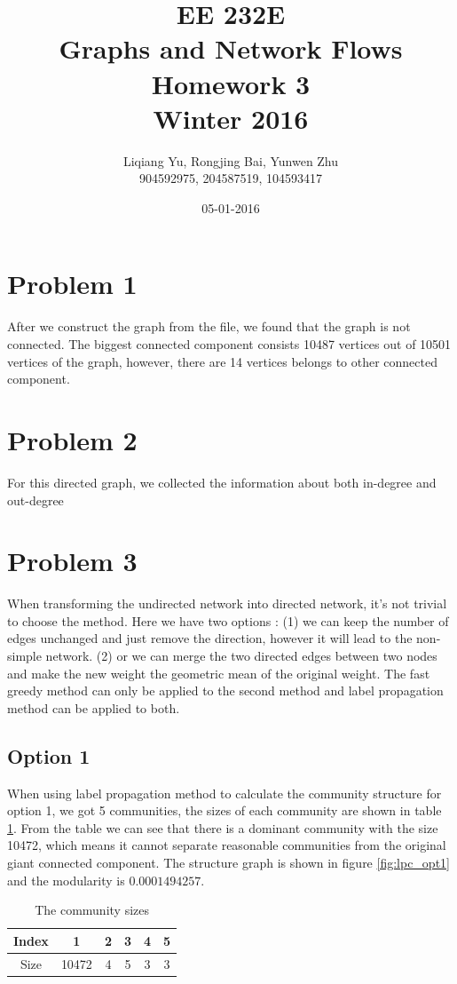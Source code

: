 \documentclass{article}
\begin{document}
\begin{titlepage}
\title{EE 232E \\Graphs and Network Flows\\Homework 3\\Winter 2016} 
\author{Liqiang Yu, Rongjing Bai, Yunwen Zhu\\
904592975, 204587519, 104593417}  %
\date{05-01-2016}
\end{titlepage}
\maketitle
\newpage
\tableofcontents
\newpage
\section{Problem 1}
After we construct the graph from the file, we found that the graph is not connected. The biggest connected component consists 10487 vertices out of 10501 vertices of the graph, however, there are 14 vertices belongs to other connected component.
\section{Problem 2}
For this directed graph, we collected the information about both in-degree and out-degree
\section{Problem 3}
When transforming the undirected network into directed network, it's not trivial to choose the method. Here we have two options : (1) we can keep the number of edges unchanged and just remove the direction, however it will lead to the  non-simple network. (2) or we can merge the two directed edges between two nodes and make the new weight the geometric mean of the original weight. The fast greedy method can only be applied to the second method and label propagation method can be applied to both.
\subsection{Option 1}
When using label propagation method to calculate the community structure for option 1, we got 5 communities, the sizes of each community are shown in table \ref{tb:p3_comsize}. From the table we can see that there is a dominant community with the size 10472, which means it cannot separate reasonable communities from the original giant connected component. The structure graph is shown in figure \ref{fig:lpc_opt1} and the modularity is $0.0001494257$.
\begin {table}[htbp]
\caption{The community sizes}
\begin{adjustbox}{center}
\label{tb:p3_comsize}
\begin{tabular}{|c|c|c|c|c|c|}
\hline
Index&1&2&3&4&5\\
\hline
Size&10472&4&5&3&3\\
\hline
\end{tabular}
\end{adjustbox}
\end{table}
\end{document}

